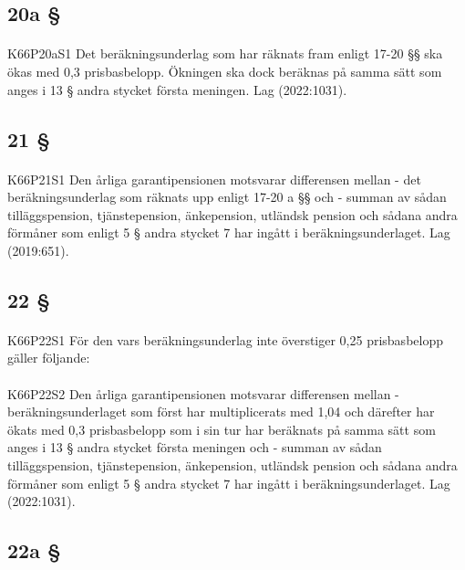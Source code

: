 \documentclass[a4paper,notitlepage,openany,10pt]{book}
\begin{document}
\subsection*{20a §}
\paragraph*{}
{\tiny K66P20aS1}
Det beräkningsunderlag som har räknats fram enligt 17-20 §§ ska ökas med 0,3 prisbasbelopp. Ökningen ska dock beräknas på samma sätt som anges i 13 § andra stycket första meningen.
Lag (2022:1031).
\subsection*{21 §}
\paragraph*{}
{\tiny K66P21S1}
Den årliga garantipensionen motsvarar differensen mellan
\newline - det beräkningsunderlag som räknats upp enligt 17-20 a §§ och
\newline - summan av sådan tilläggspension, tjänstepension, änkepension, utländsk pension och sådana andra förmåner som enligt 5 § andra stycket 7 har ingått i beräkningsunderlaget.
Lag (2019:651).
\subsection*{22 §}
\paragraph*{}
{\tiny K66P22S1}
För den vars beräkningsunderlag inte överstiger 0,25 prisbasbelopp gäller följande:
\paragraph*{}
{\tiny K66P22S2}
Den årliga garantipensionen motsvarar differensen mellan
\newline - beräkningsunderlaget som först har multiplicerats med 1,04 och därefter har ökats med 0,3 prisbasbelopp som i sin tur har beräknats på samma sätt som anges i 13 § andra stycket första meningen och
\newline - summan av sådan tilläggspension, tjänstepension, änkepension, utländsk pension och sådana andra förmåner som enligt 5 § andra stycket 7 har ingått i beräkningsunderlaget.
Lag (2022:1031).
\subsection*{22a §}
\end{document}

